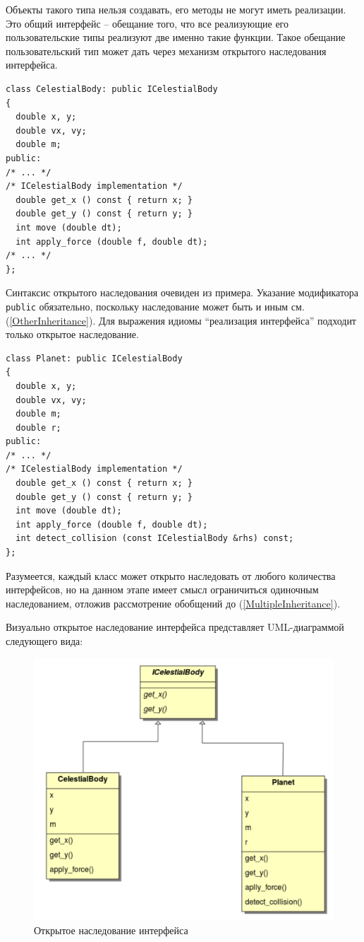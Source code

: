 \documentclass[a4paper,12pt,oneside]{article}
\begin{document}
Объекты такого типа нельзя создавать, его методы не могут иметь реализации. Это общий интерфейс -- обещание того, что все реализующие его пользовательские типы реализуют две именно такие функции. Такое обещание пользовательский тип может дать через механизм открытого наследования интерфейса.

\begin{lstlisting}
class CelestialBody: public ICelestialBody
{
  double x, y;
  double vx, vy;
  double m;
public:
/* ... */
/* ICelestialBody implementation */
  double get_x () const { return x; }
  double get_y () const { return y; }
  int move (double dt); 
  int apply_force (double f, double dt);
/* ... */
};
\end{lstlisting}

Синтаксис открытого наследования очевиден из примера. Указание модификатора \lstinline!public! обязательно, поскольку наследование может быть и иным см. (\ref{OtherInheritance}). Для выражения идиомы ``реализация интерфейса'' подходит только открытое наследование. 

\begin{lstlisting}
class Planet: public ICelestialBody
{
  double x, y;
  double vx, vy;
  double m;
  double r;
public:
/* ... */
/* ICelestialBody implementation */
  double get_x () const { return x; }
  double get_y () const { return y; }
  int move (double dt);
  int apply_force (double f, double dt);
  int detect_collision (const ICelestialBody &rhs) const;
};
\end{lstlisting}

Разумеется, каждый класс может открыто наследовать от любого количества интерфейсов, но на данном этапе имеет смысл ограничиться одиночным наследованием, отложив рассмотрение обобщений до (\ref{MultipleInheritance}).

Визуально открытое наследование интерфейса представляет UML-диаграммой следующего вида:

\begin{figure}[h!]
\centering
\includegraphics[width=1.0\textwidth]{illustrations/inhdiag.pdf}
\caption{Открытое наследование интерфейса}
\label{fig:inheritance-interface}
\end{figure}
\end{document}

